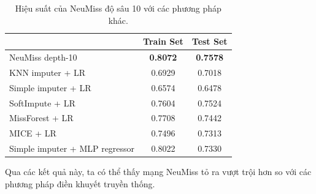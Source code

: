 \begin{table}[h!]
\centering
\setlength{\tabcolsep}{10pt}
\begin{tabular}{lcc}
\toprule
& \multicolumn{1}{c}{\textbf{Train Set}} 
& \multicolumn{1}{c}{\textbf{Test Set}} \\
\midrule
NeuMiss depth-10 & \textbf{0.8072}  & \textbf{0.7578} \\
KNN imputer + LR & 0.6929 & 0.7018 \\
Simple imputer + LR & 0.6574 & 0.6478 \\
SoftImpute + LR & 0.7604 & 0.7524 \\
MissForest + LR & 0.7708 & 0.7442 \\
MICE + LR & 0.7496 & 0.7313 \\
Simple imputer + MLP regressor & 0.8022 & 0.7330 \\

\bottomrule
\end{tabular}
\captionsetup{justification=centering, width=\linewidth}
\caption{Hiệu suất của NeuMiss độ sâu 10 với các phương pháp khác.}
\label{tab:performance-others}
\end{table}

Qua các kết quả này, ta có thể thấy mạng NeuMiss tỏ ra vượt trội hơn so với các phương pháp điền khuyết truyền thống.
